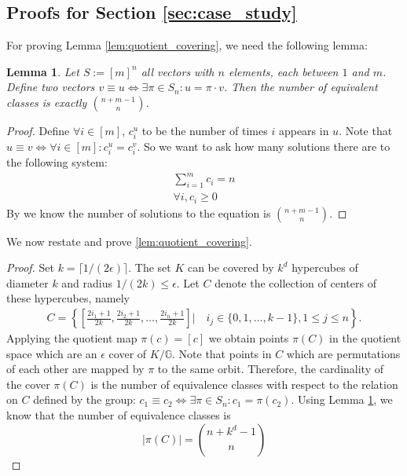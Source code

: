 \documentclass{article}
\theoremstyle{definition}
\theoremstyle{plain}
\newtheorem{lemma}[definition]{Lemma}
\newcommand{\G}{\mathbb{G}}
\begin{document}
\subsection{Proofs for Section \ref{sec:case_study}}
For proving Lemma \ref{lem:quotient_covering}, we need the following lemma: 
\begin{lemma}
    \label{comb_proof}
    Let $S := [m]^n$ all vectors with $n$ elements, each between $1$ and $m$. Define two vectors $v\equiv u \iff \exists \pi \in S_n : u = \pi \cdot v$. Then the number of equivalent classes is exactly $\binom{n+m-1}{n}$.
\end{lemma}
\begin{proof}
    Define $\forall i \in [m]$, $c^u_i$ to be the number of times $i$ appears in $u$. 
    \newline
    Note that $u \equiv v \iff \forall i\in [m]: c^u_i=c^v_i$. 
    So we want to ask how many solutions there are to the following system:
    \begin{align*}
        \sum^{m}_{i=1}c_i = n \\
        \forall i,c_i \geq 0
    \end{align*}
    By \cite{stanley2011enumerative} we know the number of solutions to the equation is $\binom{n+m-1}{n}$. 
\end{proof}
We now restate and prove \ref{lem:quotient_covering}.
\quotientcovering*
\begin{proof}
Set $k=\lceil 1/(2\epsilon) \rceil $. The set $K$ can be covered by $k^d$ hypercubes of diameter $k$ and radius $1/(2k)\leq \epsilon $. Let $C$ denote the collection of centers of these hypercubes, namely 
\begin{align*}
    C=\left\{\left[\frac{2i_1+1}{2k} ,\frac{2  i_2+1}{2k} ,\ldots,\frac{2 i_n+1}{2k} \right]| \quad  i_j \in \{0,1,\ldots,k-1 \},1\leq j \leq n \right\}   .
\end{align*}    
Applying the quotient map  $\pi(c) = [c]$ we obtain points $\pi(C)$ in the quotient space which are an $\epsilon$ cover of $K/\G$. Note that points in $C$ which are permutations of each other are mapped by $\pi$ to the same orbit. Therefore, the cardinality of the cover $\pi(C)$ is the number of equivalence classes with respect to the relation on $C$ defined by the group:  $c_1 \equiv c_2 \iff \exists \pi \in S_n : c_1 = \pi(c_2)$. Using Lemma \ref{comb_proof}, we know that the number of equivalence classes is \begin{equation*}
|\pi(C)|=    \binom{n+k^d-1}{n}
\end{equation*} 
\end{proof}
\end{document}
